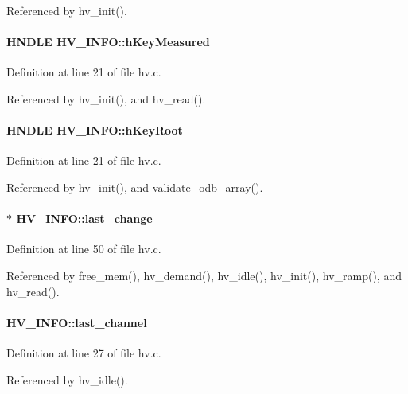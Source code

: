 Referenced by hv\_\-init().
\paragraph[{hKeyMeasured}]{\setlength{\rightskip}{0pt plus 5cm}HNDLE {\bf HV\_\-INFO::hKeyMeasured}}\hfill\label{structHV__INFO_af2b905a3cef2dab26cd394b462c88707}


Definition at line 21 of file hv.c.

Referenced by hv\_\-init(), and hv\_\-read().
\paragraph[{hKeyRoot}]{\setlength{\rightskip}{0pt plus 5cm}HNDLE {\bf HV\_\-INFO::hKeyRoot}}\hfill\label{structHV__INFO_a55accfbc1288db4424698175696d50ac}


Definition at line 21 of file hv.c.

Referenced by hv\_\-init(), and validate\_\-odb\_\-array().
\paragraph[{last\_\-change}]{$\ast$ {\bf HV\_\-INFO::last\_\-change}}\hfill\label{structHV__INFO_ace1b6ddf8f8c685313bc16796e606f81}


Definition at line 50 of file hv.c.

Referenced by free\_\-mem(), hv\_\-demand(), hv\_\-idle(), hv\_\-init(), hv\_\-ramp(), and hv\_\-read().
\paragraph[{last\_\-channel}]{ {\bf HV\_\-INFO::last\_\-channel}}\hfill\label{structHV__INFO_a2c2b5ebfbef1fd3741bbbbc204682a17}


Definition at line 27 of file hv.c.

Referenced by hv\_\-idle().

